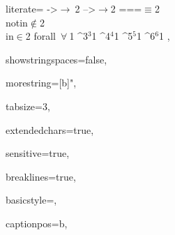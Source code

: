 {%
 literate=
       {->}{{$\rightarrow\ $}}2
       {-->}{{$\longrightarrow $}}2
       {===}{{$\equiv $}}2
       {\\notin}{{$\notin$}}2
       {\\in}{{$\in$}}2
	{forall\ }{{$\forall\ \!$}}1
	{^3}{{$^3$}}1
	{^4}{{$^4$}}1
	{^5}{{$^5$}}1
	{^6}{{$^6$}}1
,


showstringspaces=false,

morestring=[b]",

tabsize=3,

extendedchars=true,

sensitive=true,

breaklines=true,

basicstyle=\ttfamily\footnotesize,

captionpos=b,

}
